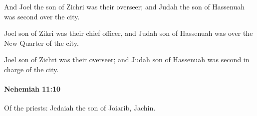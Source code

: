 			\begin{versebox}
					\item[BHS] 
					\item[LXX] 
					\item[ASV] And Joel the son of Zichri was their overseer; and Judah the son of Hassenuah was second over the city.
					\item[NIV] Joel son of Zikri was their chief officer, and Judah son of Hassenuah was over the New Quarter of the city.
					\item[NRSV] Joel son of Zichri was their overseer; and Judah son of Hassenuah was second in charge of the city.
			\end{versebox}

		\paragraph{Nehemiah 11:10} %
			\label{NEHEMIAH-11-10}

			Of the priests: Jedaiah the son of Joiarib, Jachin.

